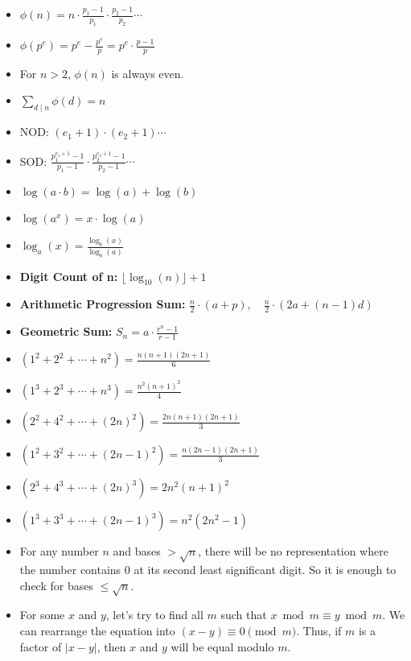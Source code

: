 {\small
\begin{itemize}
\item $\phi(n) = n \cdot \frac{p_1 - 1}{p_1} \cdot \frac{p_2 - 1}{p_2} \cdots$
\item $\phi(p^e) = p^e - \frac{p^e}{p} = p^e \cdot \frac{p-1}{p}$
\item For $n > 2$, $\phi(n)$ is always even.
\item $\sum_{d \mid n} \phi(d) = n$
\item NOD: $(e_1 + 1) \cdot (e_2 + 1) \cdots$
\item SOD: $\frac{p_1^{e_1 + 1} - 1}{p_1 - 1} \cdot \frac{p_2^{e_2 + 1} - 1}{p_2 - 1} \cdots$
\item $\log(a \cdot b) = \log(a) + \log(b)$
\item $\log(a^x) = x \cdot \log(a)$
\item $\log_a(x) = \frac{\log_b(x)}{\log_b(a)}$
\item \footnotesize \textbf{Digit Count of n: } $\lfloor \log_{10}(n) \rfloor + 1$
\item \footnotesize \textbf{Arithmetic Progression Sum: } $\frac{n}{2} \cdot (a + p), \quad \frac{n}{2} \cdot (2a + (n-1)d)$
\item \footnotesize \textbf{Geometric Sum: } $S_n = a \cdot \frac{r^n - 1}{r - 1}$
\item $(1^2 + 2^2 + \cdots + n^2) = \frac{n (n + 1) (2n + 1)}{6}$
\item $(1^3 + 2^3 + \cdots + n^3) = \frac{n^2 (n + 1)^2}{4}$
\item $(2^2 + 4^2 + \cdots + (2n)^2) = \frac{2 n (n + 1) (2n + 1)}{3}$
\item $(1^2 + 3^2 + \cdots + (2n - 1)^2) = \frac{n (2n - 1) (2n + 1)}{3}$
\item $(2^3 + 4^3 + \cdots + (2n)^3) = 2 n^2 (n + 1)^2$
\item $(1^3 + 3^3 + \cdots + (2n - 1)^3) = n^2 (2n^2 - 1)$
\item For any number $n$ and bases $> \sqrt{n}$, there will be no representation where the number contains 0 at its second least significant digit. So it is enough to check for bases $\le \sqrt{n}$.
\item For some $x$ and $y$, let's try to find all $m$ such that $x \bmod m \equiv y \bmod m$. We can rearrange the equation into $(x - y) \equiv 0 \pmod{m}$. Thus, if $m$ is a factor of $|x - y|$, then $x$ and $y$ will be equal modulo $m$.
\end{itemize}
}
